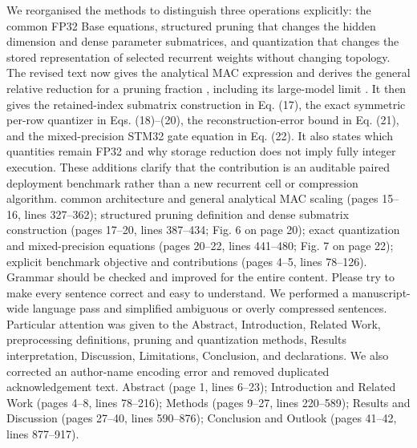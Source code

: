 {} We reorganised the methods to distinguish three operations explicitly: the common FP32 Base equations, structured pruning that changes the hidden dimension and dense parameter submatrices, and quantization that changes the stored representation of selected recurrent weights without changing topology. The revised text now gives the analytical MAC expression and derives the general relative reduction for a pruning fraction , including its large-model limit . It then gives the retained-index submatrix construction in Eq. (17), the exact symmetric per-row quantizer in Eqs. (18)--(20), the reconstruction-error bound in Eq. (21), and the mixed-precision STM32 gate equation in Eq. (22). It also states which quantities remain FP32 and why storage reduction does not imply fully integer execution. These additions clarify that the contribution is an auditable paired deployment benchmark rather than a new recurrent cell or compression algorithm.\markdownRendererParagraphSeparator
{} common architecture and general analytical MAC scaling (pages 15--16, lines 327--362); structured pruning definition and dense submatrix construction (pages 17--20, lines 387--434; Fig. 6 on page 20); exact quantization and mixed-precision equations (pages 20--22, lines 441--480; Fig. 7 on page 22); explicit benchmark objective and contributions (pages 4--5, lines 78--126).\markdownRendererInterblockSeparator
{}
\markdownRendererSectionEnd \markdownRendererSectionBegin
{}\markdownRendererInterblockSeparator
{}\markdownRendererBlockQuoteBegin
Grammar should be checked and improved for the entire content. Please try to make every sentence correct and easy to understand.\markdownRendererBlockQuoteEnd \markdownRendererInterblockSeparator
{} We performed a manuscript-wide language pass and simplified ambiguous or overly compressed sentences. Particular attention was given to the Abstract, Introduction, Related Work, preprocessing definitions, pruning and quantization methods, Results interpretation, Discussion, Limitations, Conclusion, and declarations. We also corrected an author-name encoding error and removed duplicated acknowledgement text.\markdownRendererParagraphSeparator
{} Abstract (page 1, lines 6--23); Introduction and Related Work (pages 4--8, lines 78--216); Methods (pages 9--27, lines 220--589); Results and Discussion (pages 27--40, lines 590--876); Conclusion and Outlook (pages 41--42, lines 877--917).\markdownRendererInterblockSeparator
